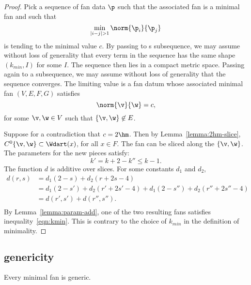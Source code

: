 \begin{proof} Pick a sequence of fan data $\p$ such that the associated
fan is a minimal fan and such that 
\begin{displaymath}
\min_{|i-j|>1} \norm{\p_i}{\p_j}
\end{displaymath}
is tending to the minimal value $c$.  By passing to s subsequence, we
may assume without loss of generality that every term in the sequence
has the same shape $(k_{min},I)$ for some $I$.  The sequence then lies
in a compact metric space.  Passing again to a subsequence, we may
assume without loss of generality that the sequence converges.  The
limiting value is a fan datum whose associated minimal fan $(V,E,F,G)$
satisfies
\begin{displaymath}
\norm{\v}{\w}=c,
\end{displaymath}
for some $\v,\w\in V$ such that $\{\v,\w\}\not\in E$.

Suppose for a contradiction that $c=2\hm$.  Then by
Lemma~\ref{lemma:2hm-slice}, $C^0\{\v,\w\}\subset \Wdart(x)$, for all
$x\in F$.  The fan can be sliced along the $\{\v,\w\}$.  The
parameters for the new pieces satisfy:
\begin{displaymath}
k' = k+2 - k'' \le k-1.
\end{displaymath}
The function $d$ is additive over slices.  For some constants $d_1$
and $d_2$,
\begin{equation}\label{eqn:drs}
\begin{array}{lll}
d(r,s) &= d_1 (2 - s) + d_2 (r + 2 s-4) \\
&= d_1 (2-s') + d_2 (r'+2 s'-4) + d_1 (2-s'') + d_2 (r''+2s''-4)\\
&= d(r',s') + d(r'',s''). \\
\end{array}
\end{equation}
By Lemma~\ref{lemma:param-add}, one of the two resulting fans
satisfies inequality~\ref{eqn:kmin}.  This is contrary to the choice
of $k_{min}$ in the definition of minimality.
\end{proof}





\subsection{genericity}

\begin{lemma}\label{lemma:circular-nonmin}
Every minimal fan is generic.
\end{lemma}

